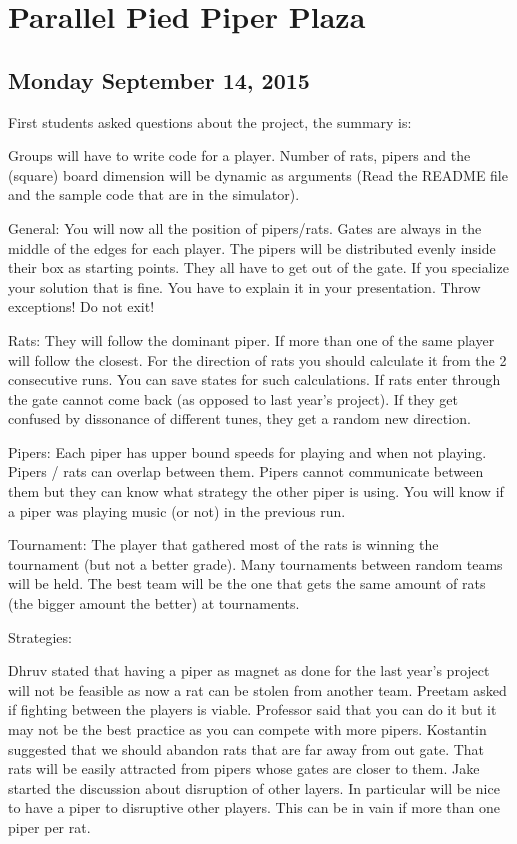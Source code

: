 \section{Parallel Pied Piper Plaza}
\subsection{Monday September 14, 2015}
First students asked questions about the project, the summary is:

Groups will have to write code for a player. Number of rats, pipers and the (square) 
board dimension will be dynamic as arguments (Read the README file and the sample 
code that are in the simulator).

General:
You will now all the position of pipers/rats.
Gates are always in the middle of the edges for each player.
The pipers will be distributed evenly inside their box as starting points.
They all have to get out of the gate.
If you specialize your solution that is fine. You have to explain it in your presentation.
Throw exceptions! Do not exit!

Rats:
They will follow the dominant piper. If more than one of the same player will 
follow the closest.
For the direction of rats you should calculate it from the 2 consecutive runs. 
You can save states for such calculations. 
If rats enter through the gate cannot come back (as opposed to last year’s project).
If they get confused by dissonance of different tunes, they get a random new direction.

Pipers:
Each piper has upper bound speeds for playing and when not playing. Pipers / rats can overlap between them. 
Pipers cannot communicate between them but they can know what strategy the other piper is using. 
You will know if a piper was playing music (or not) in the previous run.

Tournament:
The player that gathered most of the rats is winning the tournament (but not a 
better grade).
Many tournaments between random teams will be held. The best team will be the 
one that gets the same amount of rats (the bigger amount the better) at 
tournaments. 


Strategies:

Dhruv stated that having a piper as magnet as done for the last year’s project 
will not be feasible as now a rat can be stolen from another team.
Preetam asked if fighting between the players is viable. Professor said that you 
can do it but it may not be the best practice as you can compete with more pipers.
Kostantin suggested that we should abandon rats that are far away from out gate. 
That rats will be easily attracted from pipers whose gates are closer to them. 
Jake started the discussion about disruption of other layers. In particular will 
be nice to have a piper to disruptive other players. This can be in vain if more 
than one piper per rat.

